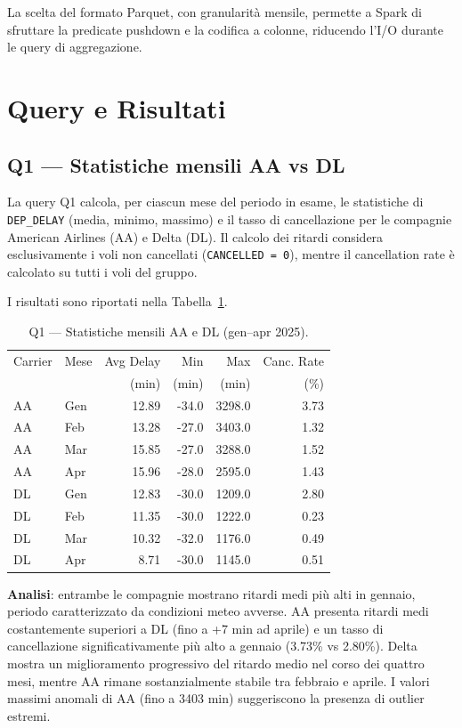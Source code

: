 \documentclass[sigconf]{acmart}
\begin{document}
La scelta del formato Parquet, con granularità mensile, permette a Spark di
sfruttare la predicate pushdown e la codifica a colonne, riducendo l'I/O
durante le query di aggregazione.

\section{Query e Risultati}

\subsection{Q1 — Statistiche mensili AA vs DL}

La query Q1 calcola, per ciascun mese del periodo in esame, le statistiche di
\texttt{DEP\_DELAY} (media, minimo, massimo) e il tasso di cancellazione per
le compagnie American Airlines (AA) e Delta (DL). Il calcolo dei ritardi
considera esclusivamente i voli non cancellati (\texttt{CANCELLED = 0}),
mentre il cancellation rate è calcolato su tutti i voli del gruppo.

I risultati sono riportati nella Tabella~\ref{tab:q1}.

\begin{table}[h]
\caption{Q1 — Statistiche mensili AA e DL (gen--apr 2025).}
\label{tab:q1}
\small
\begin{tabular}{llrrrr}
\toprule
Carrier & Mese & Avg Delay & Min & Max & Canc. Rate \\
        &      & (min)     & (min) & (min) & (\%) \\
\midrule
AA & Gen & 12.89 & -34.0 & 3298.0 & 3.73 \\
AA & Feb & 13.28 & -27.0 & 3403.0 & 1.32 \\
AA & Mar & 15.85 & -27.0 & 3288.0 & 1.52 \\
AA & Apr & 15.96 & -28.0 & 2595.0 & 1.43 \\
\midrule
DL & Gen & 12.83 & -30.0 & 1209.0 & 2.80 \\
DL & Feb & 11.35 & -30.0 & 1222.0 & 0.23 \\
DL & Mar & 10.32 & -32.0 & 1176.0 & 0.49 \\
DL & Apr &  8.71 & -30.0 & 1145.0 & 0.51 \\
\bottomrule
\end{tabular}
\end{table}

\textbf{Analisi}: entrambe le compagnie mostrano ritardi medi più alti in
gennaio, periodo caratterizzato da condizioni meteo avverse. AA presenta
ritardi medi costantemente superiori a DL (fino a +7 min ad aprile) e un tasso
di cancellazione significativamente più alto a gennaio (3.73\% vs 2.80\%).
Delta mostra un miglioramento progressivo del ritardo medio nel corso dei
quattro mesi, mentre AA rimane sostanzialmente stabile tra febbraio e aprile.
I valori massimi anomali di AA (fino a 3403 min) suggeriscono la presenza di
outlier estremi.
\end{document}
